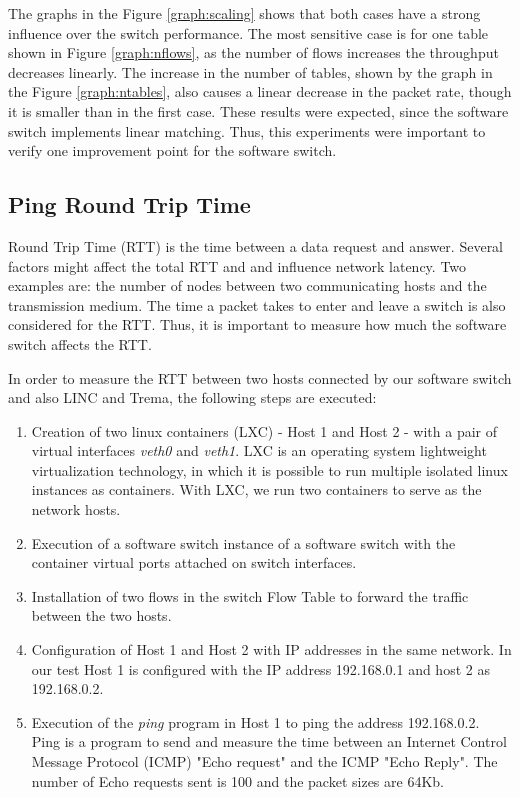         The graphs in the Figure \ref{graph:scaling} shows that both cases have a strong influence over the switch performance. The most sensitive case is for one table shown in Figure \ref{graph:nflows}, as the number of flows increases the throughput decreases linearly. The increase in the number of tables, shown by the graph in the Figure \ref{graph:ntables}, also causes a linear decrease in the packet rate, though it is smaller than in the first case. These results were expected, since the software switch implements linear matching. Thus, this experiments were important to verify one improvement point for the software switch.     
     
    \subsection{Ping Round Trip Time}

    Round Trip Time (RTT) is the time between a data request and answer. Several factors might affect the total RTT and and influence network latency. Two examples are: the number of nodes between two communicating hosts and the transmission medium. The time a packet takes to enter and leave a switch is also considered for the RTT. Thus, it is important to measure how much the software switch affects the RTT. 
    
    In order to measure the RTT between two hosts connected by our software switch and also LINC and Trema, the following steps are executed:
    
    \begin{enumerate}
    \item Creation of two linux containers (LXC) - Host 1 and Host 2 - with a pair of virtual interfaces \textit{veth0} and \textit{veth1}. LXC is an operating system lightweight virtualization technology, in which it is possible to run multiple isolated linux instances as containers. With LXC, we run two containers to serve as the network hosts.    
    \item Execution of a software switch instance of a software switch with the container virtual ports attached on switch interfaces.
    \item Installation of two flows in the switch Flow Table to forward the traffic between the two hosts. 
    \item Configuration of Host 1 and Host 2 with IP addresses in the same network. In our test Host 1 is configured with the IP address 192.168.0.1 and host 2 as 192.168.0.2. 
    \item Execution of the \textit{ping} program in Host 1 to ping the address 192.168.0.2. Ping is a program to send and measure the time between an Internet Control Message Protocol (ICMP) "Echo request" and the ICMP "Echo Reply". The number of Echo requests sent is 100 and the packet sizes are 64Kb.
    \end{enumerate}

